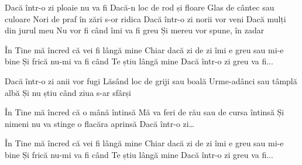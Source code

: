 
\beginverse
Dacă într-o zi ploaie nu va fi
Dacă-n loc de rod și floare
Glas de cântec sau culoare
Nori de praf în zări s-or ridica
Dacă într-o zi norii vor veni
Dacă mulți din jurul meu
Nu vor fi când îmi va fi greu
Și mereu vor spune, în zadar
\endverse

\beginchorus
În Tine mă încred că vei fi lângă mine
Chiar dacă zi de zi îmi e greu sau mi-e bine
Și frică nu-mi va fi când Te știu lângă mine
Dacă într-o zi greu va fi...
\endchorus

\beginverse
Dacă într-o zi anii vor fugi
Lăsând loc de griji sau boală
Urme-adânci sau tâmplă albă
Și nu știu când ziua s-ar sfârși
\endverse

\beginchorus
În Tine mă încred că o mână întinsă
Mă va feri de rău sau de cursa întinsă
Și nimeni nu va stinge o flacăra aprinsă
Dacă într-o zi…
\endchorus

\beginchorus
În Tine mă încred că vei fi lângă mine
Chiar dacă zi de zi îmi e greu sau mi-e bine
Și frică nu-mi va fi când Te știu lângă mine
Dacă într-o zi greu va fi...
\endchorus

\endsong